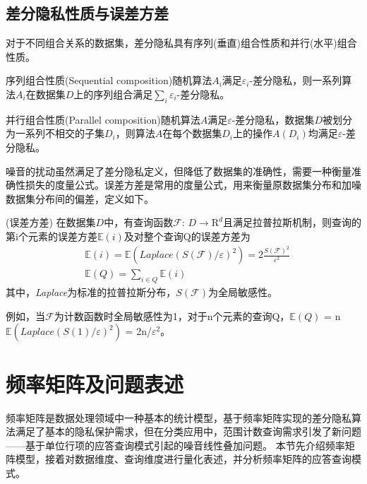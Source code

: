 \subsection{差分隐私性质与误差方差}

对于不同组合关系的数据集，差分隐私具有序列(垂直)组合性质和并行(水平)组合性质。

\begin{lem}
	序列组合性质(Sequential composition)\cite{composition}随机算法$A_{i}$满足$\varepsilon_{i}$-差分隐私，则一系列算法$A_{i}$在数据集$D$上的序列组合满足$\sum\limits_i \varepsilon_{i}$-差分隐私。
\end{lem}

\begin{lem}
	\label{parallel}
	并行组合性质(Parallel composition)\cite{composition}随机算法$A$满足$\varepsilon$-差分隐私，数据集$D$被划分为一系列不相交的子集$D_{i}$，则算法$A$在每个数据集$D_{i}$上的操作$A(D_{i})$均满足$\varepsilon$-差分隐私。
\end{lem}


噪音的扰动虽然满足了差分隐私定义，但降低了数据集的准确性，需要一种衡量准确性损失的度量公式。误差方差是常用的度量公式，用来衡量原数据集分布和加噪数据集分布间的偏差，定义如下。
\begin{defn}
	\label{thm:error}
	(\textsc{误差方差}\cite{Dwork Calibrating}) 在数据集$D$中，有查询函数$\mathcal{F}$: $D\rightarrow \mathrm{R}^d$且满足拉普拉斯机制，则查询的第i个元素的误差方差$\mathbb{E}(i)$及对整个查询Q的误差方差为
	\begin{eqnarray}
	&\mathbb{E}(i) = \mathbb{E}(\textit{Laplace}(S(\mathcal{F})/ \varepsilon)^2) = 2\frac{S(\mathcal{F})^2}{\varepsilon^2}\\
	&\mathbb{E}(Q) = \sum\nolimits_{i \in Q}\mathbb{E}(i)
	\end{eqnarray}
	其中，\textit{Laplace}为标准的拉普拉斯分布，$S(\mathcal{F})$为全局敏感性。
\end{defn}

例如，当$\mathcal{F}$为计数函数时全局敏感性为1，对于n个元素的查询Q，$\mathbb{E}(Q)$ = n$\mathbb{E}(\textit{Laplace}(S(1)/ \varepsilon)^2)$ = 2n/$\varepsilon^2$。

\section{频率矩阵及问题表述}

频率矩阵是数据处理领域中一种基本的统计模型，基于频率矩阵实现的差分隐私算法满足了基本的隐私保护需求，但在分类应用中，范围计数查询需求引发了新问题——基于单位行项的应答查询模式引起的噪音线性叠加问题。%
本节先介绍频率矩阵模型，接着对数据维度、查询维度进行量化表述，并分析频率矩阵的应答查询模式。

